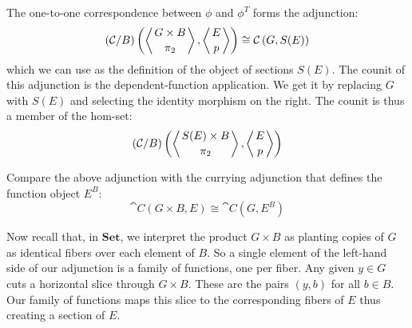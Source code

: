 \documentclass[DaoFP]{subfiles}
\begin{document}
The one-to-one correspondence between $\phi$ and $\phi^T$ forms the adjunction:
\[(\mathcal{C}/B) \left( \left \langle {G\times B \atop \pi_2} \right \rangle , \left \langle {E \atop p } \right \rangle \right) \cong \mathcal{C} \left(G, S(E)\right) \]
which we can use as the definition of the object of sections $S(E)$. The counit of this adjunction is  the dependent-function application. We get it by replacing $G$ with $S(E)$ and selecting the identity morphism on the right. The counit is thus a member of the hom-set:
\[(\mathcal{C}/B) \left( \left \langle {S(E) \times B \atop \pi_2} \right \rangle , \left \langle {E \atop p } \right \rangle \right) \]


Compare the above adjunction with the currying adjunction that defines the function object $E^B$:
\[  \cat C (G \times B, E) \cong \cat C (G, E^B) \]

Now recall that, in $\mathbf{Set}$, we interpret the product $G \times B$ as planting copies of $G$ as identical fibers over each element of $B$.  So a single element of the left-hand side of our adjunction is a family of functions, one per fiber. Any given $y \in G$ cuts a horizontal slice through $G \times B$. These are the pairs $(y, b)$ for all $b \in B$. Our family of functions maps this slice to the corresponding fibers of $E$ thus creating a section of $E$.
\end{document}
